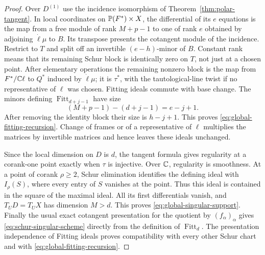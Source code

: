 \begin{proof}
Over $D^{(1)}$ use the incidence isomorphism of
Theorem~\ref{thm:polar-tangent}. In local coordinates on
$\mathbb P(F^*)\times X$, the differential of its $e$ equations is the
map from a free module of rank $M+p-1$ to one of rank $e$ obtained
by adjoining $\dot\ell\mu$ to $B$. Its transpose presents the
cotangent module of the incidence. Restrict to $T$ and split off
an invertible $(e-h)$-minor of $B$. Constant rank means that its
remaining Schur block is identically zero on $T$, not just at a
chosen point. After elementary operations the remaining nonzero block
is the map from $F^*/\mathbb C\ell$ to $Q^*$ induced by $\dot\ell\mu$;
it is $\tau^*$, with the tautological-line twist if no representative
of $\ell$ was chosen. Fitting ideals commute with base change.
The minors defining $\operatorname{Fitt}_{d+j-1}$ have size
\[
 (M+p-1)-(d+j-1)=e-j+1.
\]
After removing the identity block their size is $h-j+1$.
This proves \eqref{eq:global-fitting-recursion}. Change of frames or
of a representative of $\ell$ multiplies the matrices by invertible
matrices and hence leaves these ideals unchanged.

Since the local dimension on $D$ is $d$, the tangent formula gives
regularity at a corank-one point exactly when $\tau$ is injective.
Over $\mathbb C$, regularity is smoothness. At a point of corank $\rho\ge2$,
Schur elimination identifies the defining ideal with $I_\rho(S)$,
where every entry of $S$ vanishes at the point. Thus this ideal is
contained in the square of the maximal ideal. All its first
differentials vanish, and $T_UD=T_UX$ has dimension $M>d$.
This proves \eqref{eq:global-singular-support}.
Finally the usual exact cotangent presentation for the quotient by
$(f_\alpha)_\alpha$ gives \eqref{eq:schur-singular-scheme} directly
from the definition of $\operatorname{Fitt}_d$. The presentation
independence of Fitting ideals proves compatibility with every other
Schur chart and with \eqref{eq:global-fitting-recursion}.
\end{proof}

